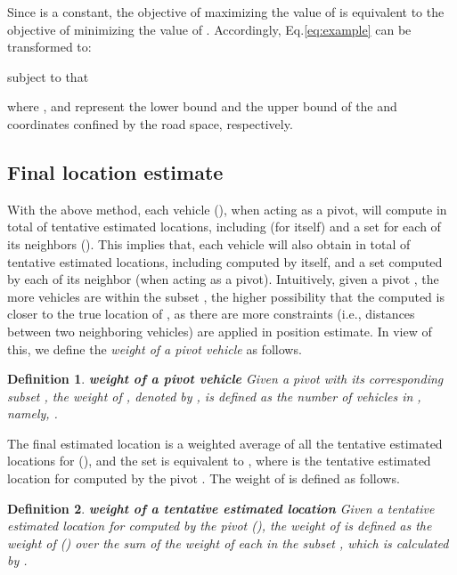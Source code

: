 \documentclass[letterpaper, 10 pt, conference]{ieeeconf}
\newtheorem{definition}{\hspace{1em}Definition}
\begin{document}
\noindent Since  is a constant, the objective of maximizing the value of  is equivalent to the objective of minimizing the value of . Accordingly, Eq.\ref{eq:example} can be transformed to:

subject to that

where
, and  represent the lower bound and the upper bound of the  and  coordinates confined by the road space, respectively.


\subsection{Final location estimate}

With the above method, each vehicle  (), when acting as a pivot, will compute in total of  tentative estimated locations, including  (for itself) and a set  for each of its neighbors ().  This implies that, each vehicle  will also obtain in total of     tentative estimated locations, including   computed by itself, and a set  computed by each of its neighbor   (when  acting as a pivot). Intuitively, given a pivot , the more vehicles are within the subset , the higher possibility that the computed 
 is closer to the true location of , as there are more constraints (i.e., distances between two neighboring vehicles) are applied in position estimate. In view of this, we define the \emph{weight of a pivot vehicle} as follows.

\vspace{0.5em}
\begin{definition}\label{def2}
\textbf{weight of a pivot vehicle} Given a pivot   with its corresponding subset , the weight of , denoted by , is defined as the number of vehicles in , namely, .
\end{definition}

The final estimated location  is a weighted average of all the tentative estimated locations for  (), and the set is equivalent to  , where  is the tentative estimated location for  computed by the pivot . The weight of  is defined as follows.

\vspace{0.5em}
\begin{definition}\label{def3}
\textbf{weight of a tentative estimated location} Given a tentative estimated location for  computed by the pivot  (), the weight of   is defined as the weight of  () over the sum of the weight of each  in the subset , which is calculated by .
\end{definition}
\end{document}
